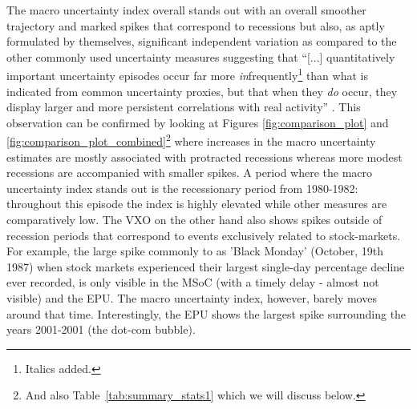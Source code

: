 \documentclass[a4paper,11pt,listof=nochaptergap,oneside,pointednumbers,bibtotoc,bigheadings,liststotoc]{scrbook}
\begin{document}
\endgroup
The macro uncertainty index overall stands out with an overall smoother trajectory and marked spikes that correspond to recessions but also, as aptly formulated by \citet{juradoetal:15} themselves, significant independent variation as compared to the other commonly used uncertainty measures suggesting that ``[...] quantitatively important uncertainty episodes occur far more \textit{in}frequently\footnote{Italics added.} than what is indicated from common uncertainty proxies, but that when they \textit{do} occur, they display larger and more persistent correlations with real activity'' \citep[p. 1181]{juradoetal:15}. This observation can be confirmed by looking at Figures \ref{fig:comparison_plot} and \ref{fig:comparison_plot_combined}\footnote{And also Table~\ref{tab:summary_stats1} which we will discuss below.} where increases in the macro uncertainty estimates are mostly associated with protracted recessions whereas more modest recessions are accompanied with smaller spikes. A period where the macro uncertainty index stands out is the recessionary period from 1980-1982: throughout this episode the index is highly elevated while other measures are comparatively low. The VXO on the other hand also shows spikes outside of recession periods that correspond to events exclusively related to stock-markets. For example, the large spike commonly to as 'Black Monday' (October, 19th 1987) when stock markets experienced their largest single-day percentage decline ever recorded, is only visible in the MSoC (with a timely delay - almost not visible) and the EPU. The macro uncertainty index, however, barely moves around that time. Interestingly, the EPU shows the largest spike surrounding the years 2001-2001 (the dot-com bubble). 

\begin{table}[t]
\centering
\caption[Correlation matrix of uncertainty measures.]{Correlation matrix of uncertainty measures. [check correlation between EPU and Macro! \citet{bakeretal:15}] report a value of 0.42 while we get 0.15!}
\label{tab:correlations}
\end{table}
\end{document}
